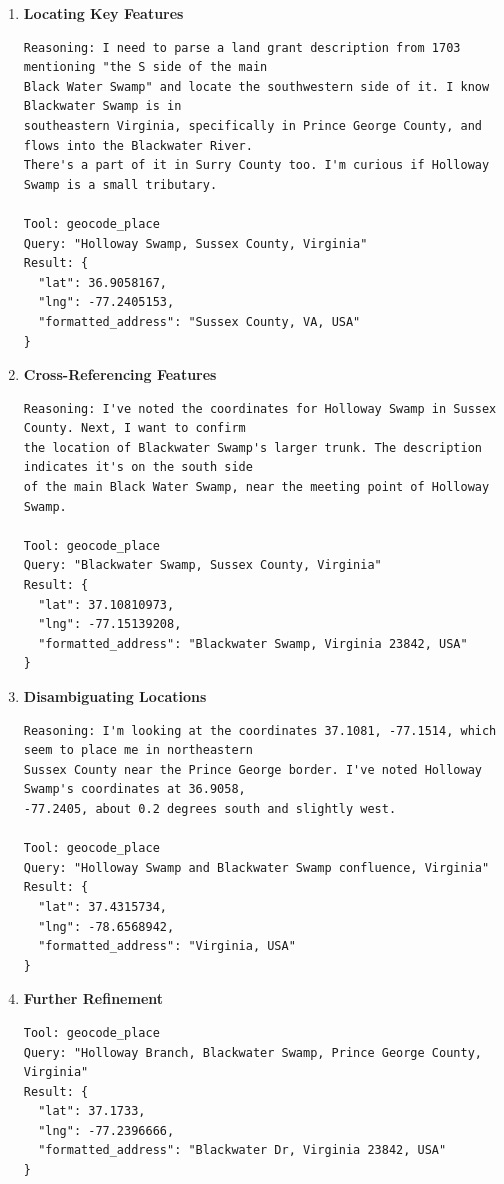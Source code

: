 \begin{enumerate}
\def\labelenumi{\arabic{enumi}.}
\item
  \textbf{Locating Key Features}

\begin{lstlisting}
Reasoning: I need to parse a land grant description from 1703 mentioning "the S side of the main 
Black Water Swamp" and locate the southwestern side of it. I know Blackwater Swamp is in 
southeastern Virginia, specifically in Prince George County, and flows into the Blackwater River. 
There's a part of it in Surry County too. I'm curious if Holloway Swamp is a small tributary.

Tool: geocode_place
Query: "Holloway Swamp, Sussex County, Virginia"
Result: {
  "lat": 36.9058167, 
  "lng": -77.2405153, 
  "formatted_address": "Sussex County, VA, USA"
}
\end{lstlisting}
\item
  \textbf{Cross-Referencing Features}

\begin{lstlisting}
Reasoning: I've noted the coordinates for Holloway Swamp in Sussex County. Next, I want to confirm 
the location of Blackwater Swamp's larger trunk. The description indicates it's on the south side 
of the main Black Water Swamp, near the meeting point of Holloway Swamp.

Tool: geocode_place
Query: "Blackwater Swamp, Sussex County, Virginia"
Result: {
  "lat": 37.10810973, 
  "lng": -77.15139208, 
  "formatted_address": "Blackwater Swamp, Virginia 23842, USA"
}
\end{lstlisting}
\item
  \textbf{Disambiguating Locations}

\begin{lstlisting}
Reasoning: I'm looking at the coordinates 37.1081, -77.1514, which seem to place me in northeastern 
Sussex County near the Prince George border. I've noted Holloway Swamp's coordinates at 36.9058, 
-77.2405, about 0.2 degrees south and slightly west.

Tool: geocode_place
Query: "Holloway Swamp and Blackwater Swamp confluence, Virginia"
Result: {
  "lat": 37.4315734, 
  "lng": -78.6568942, 
  "formatted_address": "Virginia, USA"
}
\end{lstlisting}
\item
  \textbf{Further Refinement}

\begin{lstlisting}
Tool: geocode_place
Query: "Holloway Branch, Blackwater Swamp, Prince George County, Virginia"
Result: {
  "lat": 37.1733, 
  "lng": -77.2396666, 
  "formatted_address": "Blackwater Dr, Virginia 23842, USA"
}


\end{lstlisting}
\end{enumerate}
